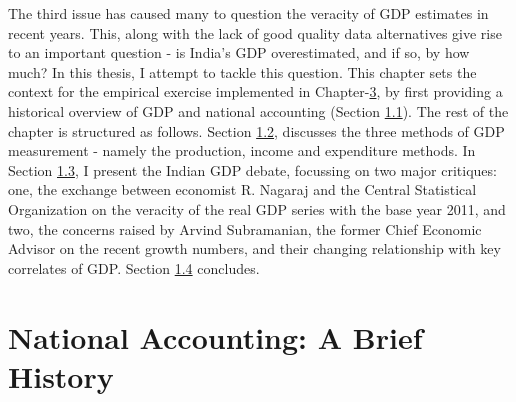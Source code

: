 \documentclass[12pt,nobind, a4paper]{reedthesis}
\begin{document}
 The third issue has caused many to question the veracity of GDP estimates in recent years. This, along with the lack of good quality data alternatives give rise to an important question - is India's GDP overestimated, and if so, by how much? In this thesis, I attempt to tackle this question. This chapter sets the context for the empirical exercise implemented in Chapter-\protect\hyperlink{ch3}{3}, by first providing a historical overview of GDP and national accounting (Section \protect\hyperlink{his}{1.1}). The rest of the chapter is structured as follows. Section \protect\hyperlink{met}{1.2}, discusses the three methods of GDP measurement - namely the production, income and expenditure methods. In Section \protect\hyperlink{deb}{1.3}, I present the Indian GDP debate, focussing on two major critiques: one, the exchange between economist R. Nagaraj and the Central Statistical Organization on the veracity of the real GDP series with the base year 2011, and two, the concerns raised by Arvind Subramanian, the former Chief Economic Advisor on the recent growth numbers, and their changing relationship with key correlates of GDP. Section \protect\hyperlink{ccn}{1.4} concludes.

 \hypertarget{his}{%
 \section{National Accounting: A Brief History}\label{his}}
\end{document}
